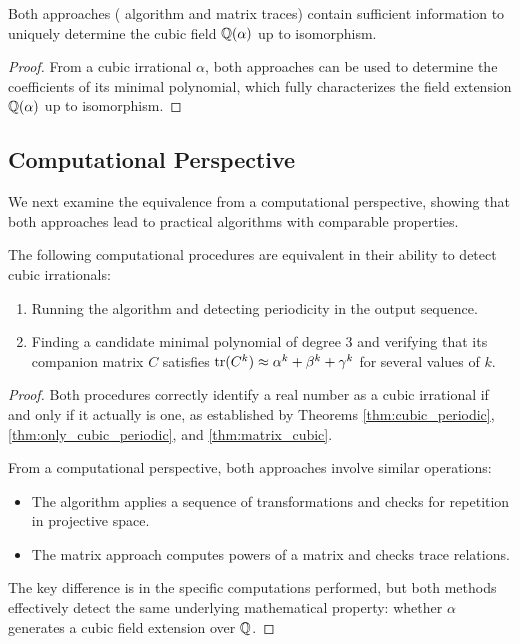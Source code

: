 \begin{corollary}\label{cor:information_content}
Both approaches (\HAPD{} algorithm and matrix traces) contain sufficient information to uniquely determine the cubic field $\mathbb{Q}(\alpha)$ up to isomorphism.
\end{corollary}

\begin{proof}
From a cubic irrational $\alpha$, both approaches can be used to determine the coefficients of its minimal polynomial, which fully characterizes the field extension $\mathbb{Q}(\alpha)$ up to isomorphism.
\end{proof}

\subsection{Computational Perspective}

We next examine the equivalence from a computational perspective, showing that both approaches lead to practical algorithms with comparable properties.

\begin{theorem}\label{thm:computational_equivalence}
The following computational procedures are equivalent in their ability to detect cubic irrationals:
\begin{enumerate}
    \item Running the \HAPD{} algorithm and detecting periodicity in the output sequence.
    \item Finding a candidate minimal polynomial of degree 3 and verifying that its companion matrix $C$ satisfies $\operatorname{tr}(C^k) \approx \alpha^k + \beta^k + \gamma^k$ for several values of $k$.
\end{enumerate}
\end{theorem}

\begin{proof}
Both procedures correctly identify a real number as a cubic irrational if and only if it actually is one, as established by Theorems \ref{thm:cubic_periodic}, \ref{thm:only_cubic_periodic}, and \ref{thm:matrix_cubic}.

From a computational perspective, both approaches involve similar operations:
\begin{itemize}
    \item The \HAPD{} algorithm applies a sequence of transformations and checks for repetition in projective space.
    \item The matrix approach computes powers of a matrix and checks trace relations.
\end{itemize}

The key difference is in the specific computations performed, but both methods effectively detect the same underlying mathematical property: whether $\alpha$ generates a cubic field extension over $\mathbb{Q}$.
\end{proof}

